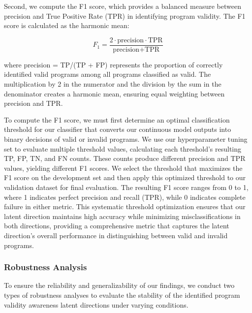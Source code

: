 \documentclass[11pt]{article}
\begin{document}
Second, we compute the F1 score, which provides a balanced measure between precision and True Positive Rate (TPR) in identifying program validity. The F1 score is calculated as the harmonic mean:

\begin{equation}
F_1 = \frac{2 \cdot \text{precision} \cdot \text{TPR}}{\text{precision} + \text{TPR}}
\end{equation}

where precision = TP/(TP + FP) represents the proportion of correctly identified valid programs among all programs classified as valid. The multiplication by 2 in the numerator and the division by the sum in the denominator creates a harmonic mean, ensuring equal weighting between precision and TPR. 

To compute the F1 score, we must first determine an optimal classification threshold for our classifier that converts our continuous model outputs into binary decisions of valid or invalid programs. We use our hyperparameter tuning set to evaluate multiple threshold values, calculating each threshold's resulting TP, FP, TN, and FN counts. These counts produce different precision and TPR values, yielding different F1 scores. We select the threshold that maximizes the F1 score on the development set and then apply this optimized threshold to our validation dataset for final evaluation. The resulting F1 score ranges from 0 to 1, where 1 indicates perfect precision and recall (TPR), while 0 indicates complete failure in either metric. This systematic threshold optimization ensures that our latent direction maintains high accuracy while minimizing misclassifications in both directions, providing a comprehensive metric that captures the latent direction's overall performance in distinguishing between valid and invalid programs.


\subsubsection{Robustness Analysis}

To ensure the reliability and generalizability of our findings, we conduct two types of robustness analyses to evaluate the stability of the identified program validity awareness latent directions under varying conditions.
\end{document}
